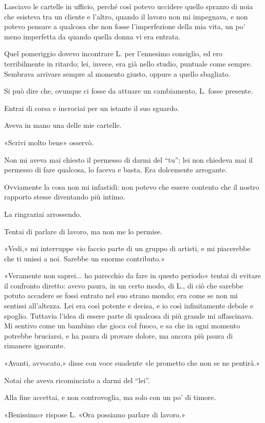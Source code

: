 \documentclass[a4paper,12pt]{book}
\begin{document}
Lasciavo le cartelle in ufficio, perché così potevo uccidere quello sprazzo di
noia che esisteva tra un cliente e l’altro, quando il lavoro non mi impegnava,
e non potevo pensare a qualcosa che non fosse l’imperfezione della mia vita,
un po’ meno imperfetta da quando quella donna vi era entrata.

Quel pomeriggio dovevo incontrare L. per l’ennesimo consiglio, ed ero
terribilmente in ritardo; lei, invece, era già nello studio, puntuale come
sempre. Sembrava arrivare sempre al momento giusto, oppure a quello sbagliato.

Si può dire che, ovunque ci fosse da attuare un cambiamento, L. fosse presente.

Entrai di corsa e incrociai per un istante il suo sguardo.

Aveva in mano una delle mie cartelle.

«Scrivi molto bene» osservò.

Non mi aveva mai chiesto il permesso di darmi del ``tu''; lei non chiedeva mai
il permesso di fare qualcosa, lo faceva e basta. Era dolcemente arrogante.

Ovviamente la cosa non mi infastidì: non potevo che essere contento che il
nostro rapporto stesse diventando più intimo.

La ringraziai arrossendo.

Tentai di parlare di lavoro, ma non me lo permise.

«Vedi,» mi interruppe «io faccio parte di un gruppo di artisti, e mi
piacerebbe che ti unissi a noi. Sarebbe un enorme contributo.»

 «Veramente non saprei... ho parecchio da fare in questo periodo» tentai di
evitare il confronto diretto: avevo paura, in un certo modo, di L., di ciò che
sarebbe potuto accadere se fossi entrato nel suo strano mondo; era come se non
mi sentissi all’altezza. Lei era così potente e decisa, e io così
infinitamente debole e spoglio. Tuttavia l’idea di essere parte di qualcosa di
più grande mi affascinava. Mi sentivo come un bambino che gioca col fuoco, e sa
che in ogni momento potrebbe bruciarsi, e ha paura di provare dolore, ma ancora
più paura di rimanere ignorante.

«Avanti, avvocato,» disse con voce suadente «le prometto che non se ne
pentirà.»

Notai che aveva ricominciato a darmi del ``lei''.

Alla fine accettai, e non controvoglia, ma solo con un po’ di timore.

«Benissimo» rispose L. «Ora possiamo parlare di lavoro.»
\end{document}
